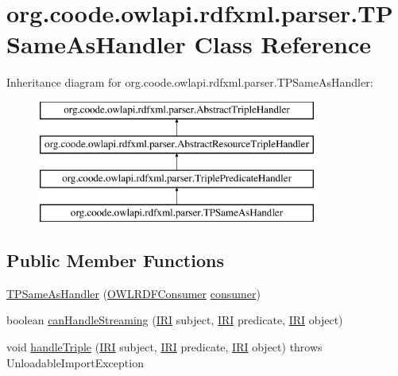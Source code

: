 \hypertarget{classorg_1_1coode_1_1owlapi_1_1rdfxml_1_1parser_1_1_t_p_same_as_handler}{\section{org.\-coode.\-owlapi.\-rdfxml.\-parser.\-T\-P\-Same\-As\-Handler Class Reference}
\label{classorg_1_1coode_1_1owlapi_1_1rdfxml_1_1parser_1_1_t_p_same_as_handler}
}
Inheritance diagram for org.\-coode.\-owlapi.\-rdfxml.\-parser.\-T\-P\-Same\-As\-Handler\-:\begin{figure}[H]
\begin{center}
\leavevmode
\includegraphics[height=4.000000cm]{classorg_1_1coode_1_1owlapi_1_1rdfxml_1_1parser_1_1_t_p_same_as_handler}
\end{center}
\end{figure}
\subsection*{Public Member Functions}
\begin{DoxyCompactItemize}
\item 
\hyperlink{classorg_1_1coode_1_1owlapi_1_1rdfxml_1_1parser_1_1_t_p_same_as_handler_adbf750d2f0e0cb71315b791e250287c6}{T\-P\-Same\-As\-Handler} (\hyperlink{classorg_1_1coode_1_1owlapi_1_1rdfxml_1_1parser_1_1_o_w_l_r_d_f_consumer}{O\-W\-L\-R\-D\-F\-Consumer} \hyperlink{classorg_1_1coode_1_1owlapi_1_1rdfxml_1_1parser_1_1_abstract_triple_handler_a4ccf4d898ff01eb1cadfa04b23d54e9c}{consumer})
\item 
boolean \hyperlink{classorg_1_1coode_1_1owlapi_1_1rdfxml_1_1parser_1_1_t_p_same_as_handler_a3137a9dae3e158b612495209bdd2384f}{can\-Handle\-Streaming} (\hyperlink{classorg_1_1semanticweb_1_1owlapi_1_1model_1_1_i_r_i}{I\-R\-I} subject, \hyperlink{classorg_1_1semanticweb_1_1owlapi_1_1model_1_1_i_r_i}{I\-R\-I} predicate, \hyperlink{classorg_1_1semanticweb_1_1owlapi_1_1model_1_1_i_r_i}{I\-R\-I} object)
\item 
void \hyperlink{classorg_1_1coode_1_1owlapi_1_1rdfxml_1_1parser_1_1_t_p_same_as_handler_ac6f79aace1bcbd6350ecfe02563349d4}{handle\-Triple} (\hyperlink{classorg_1_1semanticweb_1_1owlapi_1_1model_1_1_i_r_i}{I\-R\-I} subject, \hyperlink{classorg_1_1semanticweb_1_1owlapi_1_1model_1_1_i_r_i}{I\-R\-I} predicate, \hyperlink{classorg_1_1semanticweb_1_1owlapi_1_1model_1_1_i_r_i}{I\-R\-I} object)  throws Unloadable\-Import\-Exception 
\end{DoxyCompactItemize}
